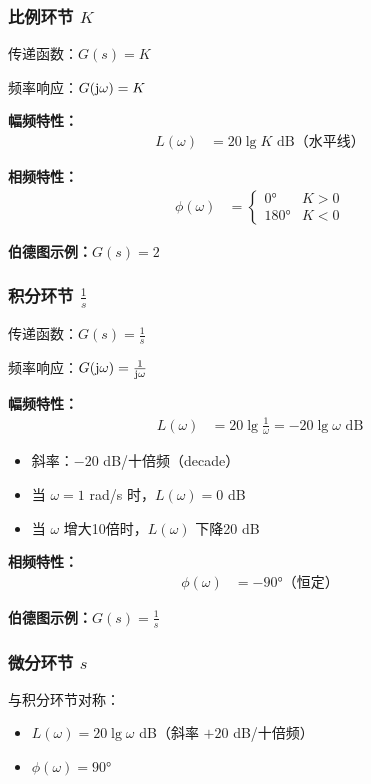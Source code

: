 \subsubsection{比例环节 \texorpdfstring{$K$}{K}}
传递函数：$G(s) = K$

频率响应：$G(\mathrm{j}\omega) = K$

\textbf{幅频特性：}
\begin{align*}
L(\omega) &= 20\lg K \text{ dB（水平线）}
\end{align*}

\textbf{相频特性：}
\begin{align*}
\phi(\omega) &= \begin{cases}
0° & K > 0 \\
180° & K < 0
\end{cases}
\end{align*}

\textbf{伯德图示例：}$G(s) = 2$
\begin{center}
\end{center}

\subsubsection{积分环节 $\frac{1}{s}$}
传递函数：$G(s) = \frac{1}{s}$

频率响应：$G(\mathrm{j}\omega) = \frac{1}{\mathrm{j}\omega}$

\textbf{幅频特性：}
\begin{align*}
L(\omega) &= 20\lg\frac{1}{\omega} = -20\lg\omega \text{ dB}
\end{align*}
\begin{itemize}
    \item 斜率：$-20$ dB/十倍频（decade）
    \item 当 $\omega = 1$ rad/s 时，$L(\omega) = 0$ dB
    \item 当 $\omega$ 增大10倍时，$L(\omega)$ 下降20 dB
\end{itemize}

\textbf{相频特性：}
\begin{align*}
\phi(\omega) &= -90°\text{（恒定）}
\end{align*}

\textbf{伯德图示例：}$G(s) = \frac{1}{s}$
\begin{center}
\end{center}

\subsubsection{微分环节 $s$}
与积分环节对称：
\begin{itemize}
    \item $L(\omega) = 20\lg\omega$ dB（斜率 $+20$ dB/十倍频）
    \item $\phi(\omega) = 90°$
\end{itemize}

